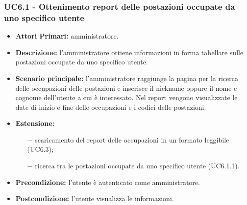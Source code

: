 \subsubsection{ UC6.1 - Ottenimento report delle postazioni occupate da uno specifico utente}
\begin{itemize}
           	\item\textbf{Attori Primari:} 
           	amministratore.
           	\item\textbf{Descrizione:} 
           	l'amministratore ottiene informazioni in forma tabellare sulle postazioni occupate da uno specifico utente.
           	\item\textbf{Scenario principale:} 
           	l'amministratore raggiunge la pagina per la ricerca delle occupazioni delle postazioni e inserisce il nickname oppure il nome e cognome dell'utente a cui è interessato.
           	Nel report vengono visualizzate le date di inizio e fine delle occupazioni e i codici delle postazioni.
           	\item\textbf{Estensione:}
           	\begin{itemize}
           		\item[$-$] scaricamento del report delle occupazioni in un formato leggibile (UC6.3);
           		\item[$-$] ricerca tra le postazioni occupate da uno specifico utente (UC6.1.1).
           	\end{itemize}
           	\item\textbf{Precondizione:} 
           	l'utente è autenticato come amministratore.
           	\item\textbf{Postcondizione:}
           	l'utente visualizza le informazioni.
\end{itemize}

